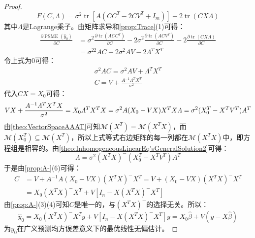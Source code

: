 \begin{proof}
\begin{equation*}
		F(C,\varLambda)=\sigma^2\operatorname{tr}[A(CC^T-2CV^T+I_m)]-2\operatorname{tr}(CX\varLambda)
	\end{equation*}
	其中$\varLambda$是Lagrange乘子。由矩阵求导和\cref{prop:Trace}(1)可得：
	\begin{align*}
		\frac{\partial\operatorname{PSME}(\hat{y}_0)}{\partial C}&=\sigma^2\frac{\partial\operatorname{tr}(ACC^T)}{\partial C}-2\sigma^2\frac{\partial\operatorname{tr}(ACV^T)}{\partial C}-2\frac{\partial\operatorname{tr}(CX\varLambda)}{\partial C} \\
		&=\sigma^22AC-2\sigma^2AV-2\varLambda^TX^T
	\end{align*}
	令上式为$0$可得：
	\begin{gather*}
		\sigma^2AC=\sigma^2AV+\varLambda^TX^T \\
		C=V+\frac{A^{-1}\varLambda^TX^T}{\sigma^2}
	\end{gather*}
	代入$CX=X_0$可得：
	\begin{equation*}
		VX+\frac{A^{-1}\varLambda^TX^TX}{\sigma^2}=X_0 \\
		\varLambda^TX^TX=\sigma^2A(X_0-VX) \\
		X^TX\varLambda=\sigma^2(X_0^T-X^TV^T)A^T
	\end{equation*}
	由\cref{theo:VectorSpaceAAAT}可知$\mathcal{M}(X^T)=\mathcal{M}(X^TX)$，而$\mathcal{M}(X_0^T)\subseteq\mathcal{M}(X^T)$，所以上式等式右边矩阵的每一列都在$\mathcal{M}(X^TX)$中，即方程组是相容的。由\cref{theo:InhomogeneousLinearEq'sGeneralSolution2}可得：
	\begin{equation*}
		\varLambda=\sigma^2(X^TX)^-(X_0^T-X^TV^T)A^T
	\end{equation*}
	于是由\cref{prop:A-}(6)可得：
	\begin{align*}
		C&=V+A^{-1}A(X_0-VX)(X^TX)^-X^T=V+(X_0-VX)(X^TX)^-X^T \\
		&=X_0(X^TX)^-X^T+V[I_n-X(X^TX)^-X^T]
	\end{align*}
	由\cref{prop:A-}(3)(4)可知$C$是唯一的，与$(X^TX)^-$的选择无关。所以：
	\begin{equation*}
		\hat{y}_0=X_0(X^TX)^-X^Ty+V[I_n-X(X^TX)^-X^T]y=X_0\hat{\beta}+V(y-X\hat{\beta})
	\end{equation*}
	为$y_0$在广义预测均方误差意义下的最优线性无偏估计。
\end{proof}
